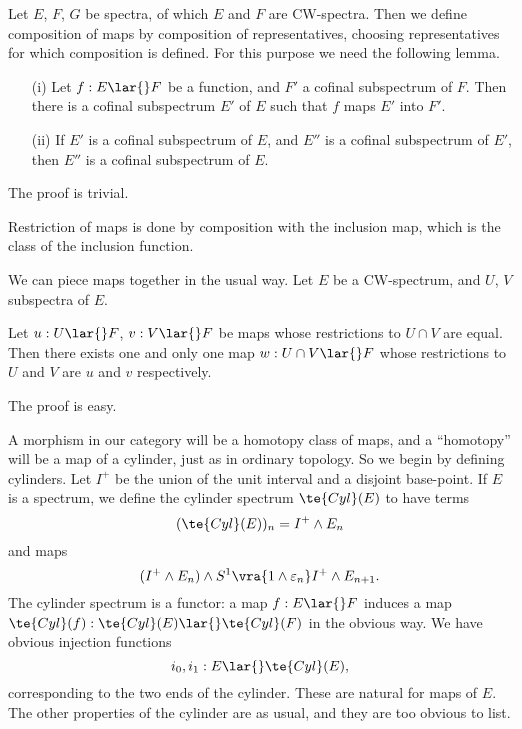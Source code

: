 \documentclass[../main]{subfiles}
\begin{document}
Let $E$, $F$, $G$ be spectra, of which $E$ and $F$ are CW-spectra. Then we define composition of maps by composition of representatives, choosing representatives for which composition is defined. For this purpose we need the following lemma.

\begin{lemma}
    \begin{enumerate}
    \item[(i)]  Let $f:E\lar{} F$ be a function, and $F'$ a cofinal subspectrum of $F$. Then there is a cofinal subspectrum $E'$ of $E$ such that $f$ maps $E'$ into $F'$.
    \item[(ii)] If $E'$ is a cofinal subspectrum of $E$, and $E''$ is a cofinal subspectrum of $E'$, then $E''$ is a cofinal subspectrum of $E$.
    \end{enumerate}
\end{lemma}

The proof is trivial.

Restriction of maps is done by composition with the inclusion map, which is the class of the inclusion function.

We can piece maps together in the usual way. Let $E$ be a CW-spectrum, and $U$, $V$ subspectra of $E$.

\begin{lemma}
Let $u: U\lar{} F$, $v: V\lar{} F$ be maps whose restrictions to $U\cap V$ are equal. Then there exists one and only one map $w: U\cap V \lar{} F$ whose restrictions to $U$ and $V$ are $u$ and $v$ respectively.
\end{lemma}

The proof is easy.

A morphism in our category will be a homotopy class of maps, and a ``homotopy'' will be a map of a cylinder, just as in ordinary topology. So we begin by defining cylinders. Let $I^+$ be the union of the unit interval and a disjoint base-point. If $E$ is a spectrum, we define the cylinder spectrum $\te{Cyl}(E)$ to have terms
\[
(\te{Cyl}(E))_n = I^+ \wedge E_n
\]
and maps
\[
(I^+ \wedge E_n)\wedge S^1
\vra{1\wedge \varepsilon_n}
I^+ \wedge E_{n+1}.
\]
The cylinder spectrum is a functor: a map $f: E\lar{} F$ induces a map $\te{Cyl}(f): \te{Cyl}(E) \lar{} \te{Cyl}(F)$ in the obvious way. We have obvious injection functions
\[
i_0,i_1: E \lar{} \te{Cyl}(E),
\]
corresponding to the two ends of the cylinder. These are natural for maps of $E$. The other properties of the cylinder are as usual, and they are too obvious to list.
\end{document}
